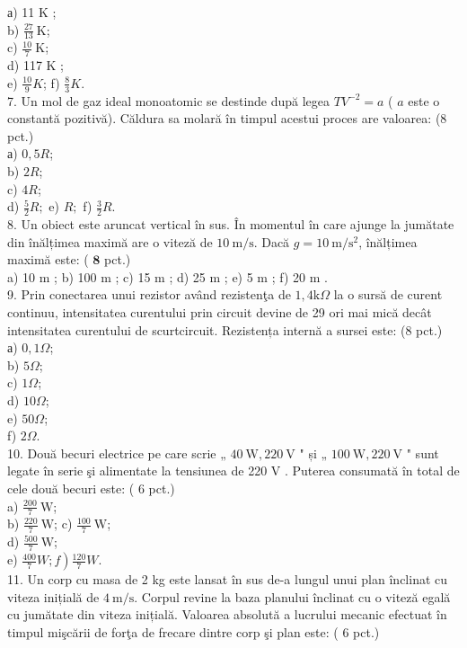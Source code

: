 а) 11 K ;\\
b) $\frac{27}{13} \mathrm{~K}$;\\
c) $\frac{10}{7} \mathrm{~K}$;\\
d) 117 K ;\\
e) $\frac{10}{9} K$; f) $\frac{8}{3} K$.\\
7. Un mol de gaz ideal monoatomic se destinde după legea $T V^{-2}=a$ ( $a$ este o constantă pozitivă). Căldura sa molară în timpul acestui proces are valoarea: (8 pct.)\\
а) $0,5 R$;\\
b) $2 R$;\\
c) $4 R$;\\
d) $\frac{5}{2} R ;$ e) $R ;$ f) $\frac{3}{2} R$.\\
8. Un obiect este aruncat vertical în sus. În momentul în care ajunge la jumătate din înălțimea maximă are o viteză de $10 \mathrm{~m} / \mathrm{s}$. Dacă $g=10 \mathrm{~m} / \mathrm{s}^{2}$, înălțimea maximă este: ( $\mathbf{8}$ pct.)\\
a) 10 m ; b) 100 m ; c) 15 m ; d) 25 m ; e) 5 m ; f) 20 m .\\
9. Prin conectarea unui rezistor având rezistenţa de $1,4 \mathrm{k} \Omega$ la o sursă de curent continuu, intensitatea curentului prin circuit devine de 29 ori mai mică decât intensitatea curentului de scurtcircuit. Rezistența internă a sursei este: (8 pct.)\\
а) $0,1 \Omega$;\\
b) $5 \Omega$;\\
c) $1 \Omega$;\\
d) $10 \Omega$;\\
e) $50 \Omega$;\\
f) $2 \Omega$.\\
10. Două becuri electrice pe care scrie „ $40 \mathrm{~W}, 220 \mathrm{~V}$ " și „ $100 \mathrm{~W}, 220 \mathrm{~V}$ " sunt legate în serie şi alimentate la tensiunea de 220 V . Puterea consumată în total de cele două becuri este: ( 6 pct.)\\
a) $\frac{200}{7} \mathrm{~W}$;\\
b) $\frac{220}{7} \mathrm{~W}$; c) $\frac{100}{7} \mathrm{~W}$;\\
d) $\frac{500}{7} \mathrm{~W}$;\\
e) $\left.\frac{400}{7} W ; f\right) \frac{120}{7} W$.\\
11. Un corp cu masa de 2 kg este lansat în sus de-a lungul unui plan înclinat cu viteza inițială de $4 \mathrm{~m} / \mathrm{s}$. Corpul revine la baza planului înclinat cu o viteză egală cu jumătate din viteza inițială. Valoarea absolută a lucrului mecanic efectuat în timpul mişcării de forţa de frecare dintre corp şi plan este: ( 6 pct.)\\
